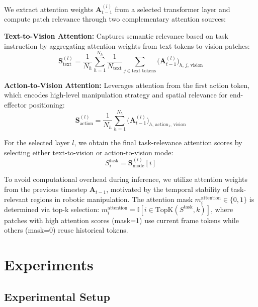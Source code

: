 \documentclass[letterpaper]{article}
\begin{document}
We extract attention weights $\mathbf{A}_{t-1}^{(l)}$ from a selected transformer layer and compute patch relevance through two complementary attention sources:

\textbf{Text-to-Vision Attention:} Captures semantic relevance based on task instruction by aggregating attention weights from text tokens to vision patches:
\begin{equation}
\mathbf{S}_{\text{text}}^{(l)} = \frac{1}{N_h} \sum_{h=1}^{N_h} \frac{1}{N_{\text{text}}} \sum_{j \in \text{text tokens}} \big(\mathbf{A}_{t-1}^{(l)}\big)_{h,\, j,\, \text{vision}}
\end{equation}

\textbf{Action-to-Vision Attention:} Leverages attention from the first action token, which encodes high-level manipulation strategy and spatial relevance for end-effector positioning:
\begin{equation}
\mathbf{S}_{\text{action}}^{(l)} = \frac{1}{N_h} \sum_{h=1}^{N_h} \big(\mathbf{A}_{t-1}^{(l)}\big)_{h,\, \text{action}_1,\, \text{vision}}
\end{equation}

For the selected layer $l$, we obtain the final task-relevance attention scores by selecting either text-to-vision or action-to-vision mode:
\begin{equation}
S_i^{\text{task}} = \mathbf{S}_{\text{mode}}^{(l)}[i]
\end{equation}

To avoid computational overhead during inference, we utilize attention weights from the previous timestep $\mathbf{A}_{t-1}$, motivated by the temporal stability of task-relevant regions in robotic manipulation. The attention mask $m_i^{\text{attention}} \in \{0,1\}$ is determined via top-k selection: $m_i^{\text{attention}} = \mathbb{I}[i \in \text{TopK}(S^{\text{task}}, k)]$, where patches with high attention scores (mask=1) use current frame tokens while others (mask=0) reuse historical tokens.



\section{Experiments}

\subsection{Experimental Setup}
\end{document}
